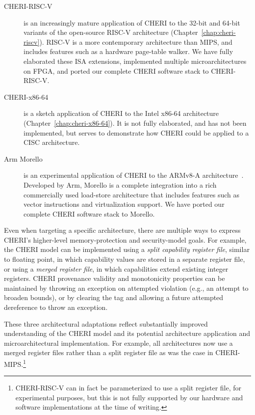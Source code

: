 \begin{description}
\item[CHERI-RISC-V] is an increasingly mature application of CHERI to the
  32-bit and 64-bit variants of the open-source RISC-V architecture
  (Chapter~\ref{chap:cheri-riscv}).
  RISC-V is a more contemporary architecture than MIPS, and includes features
  such as a hardware page-table walker.
  We have fully elaborated these ISA extensions, implemented multiple
  microarchitectures on FPGA, and ported our complete CHERI software stack to
  CHERI-RISC-V.

\item[CHERI-x86-64] is a sketch application of CHERI to the Intel x86-64
  architecture (Chapter~\ref{chap:cheri-x86-64}).
  It is not fully elaborated, and has not been implemented, but serves to
  demonstrate how CHERI could be applied to a CISC architecture.

\item[Arm Morello] is an experimental application of CHERI to the ARMv8-A
  architecture~\cite{arm-morello}.  Developed by Arm, Morello is a complete
  integration into
  a rich commercially used load-store architecture that includes features
  such as vector instructions and virtualization support.
  We have ported our complete CHERI software stack to Morello.
\end{description}

Even when targeting a specific architecture, there are multiple ways to
express CHERI's higher-level memory-protection and security-model goals.
For example, the CHERI model can be implemented using a \textit{split
capability register file}, similar to floating point, in which capability
values are stored in a separate register file, or using a \textit{merged
register file}, in which capabilities extend existing integer registers.
CHERI provenance validity and monotonicity properties can be maintained by
throwing an exception on attempted violation (e.g., an attempt to broaden
bounds), or by clearing the tag and allowing a future attempted dereference
to throw an exception.

These three architectural adaptations reflect substantially improved
understanding of the CHERI model and its potential architecture application
and microarchitectural implementation.
For example, all architectures now use a merged register files rather than
a split register file as was the case in CHERI-MIPS.\footnote{CHERI-RISC-V can
  in fact be parameterized to use a split register file, for experimental
  purposes, but this is not fully supported by our hardware and software
  implementations at the time of writing.}

